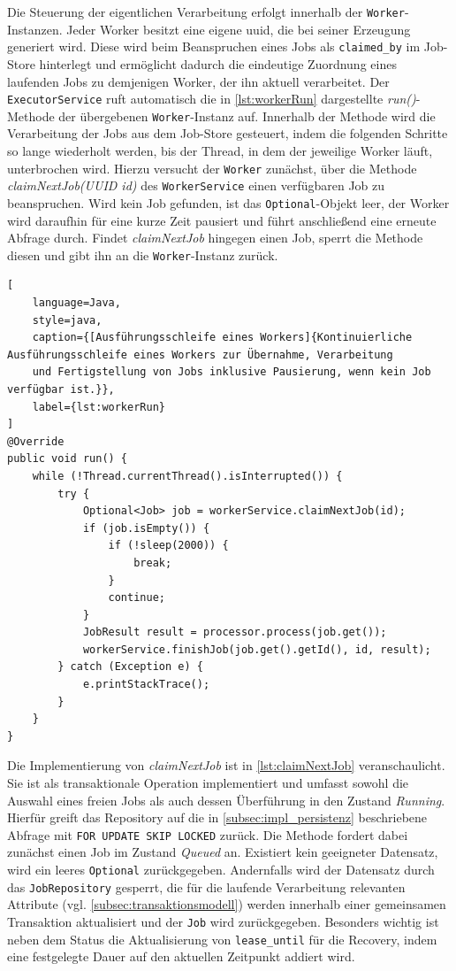 Die Steuerung der eigentlichen Verarbeitung erfolgt innerhalb der \texttt{Worker}-Instanzen.
Jeder Worker besitzt eine eigene \gls{uuid}, die bei seiner Erzeugung generiert wird.
Diese wird beim Beanspruchen eines Jobs als \texttt{claimed\_by} im Job-Store hinterlegt und ermöglicht dadurch die
eindeutige Zuordnung eines laufenden Jobs zu demjenigen Worker, der ihn aktuell verarbeitet.
Der \texttt{ExecutorService} ruft automatisch die in \cref{lst:workerRun} dargestellte \textit{run()}-Methode der übergebenen
\texttt{Worker}-Instanz auf.
Innerhalb der Methode wird die Verarbeitung der Jobs aus dem Job-Store gesteuert, indem die folgenden Schritte so lange wiederholt werden,
bis der Thread, in dem der jeweilige Worker läuft, unterbrochen wird.
Hierzu versucht der \texttt{Worker} zunächst, über die Methode \textit{claimNextJob(UUID id)} des \texttt{WorkerService}
einen verfügbaren Job zu beanspruchen.
Wird kein Job gefunden, ist das \texttt{Optional}-Objekt leer, der Worker wird daraufhin für eine kurze Zeit pausiert und
führt anschließend eine erneute Abfrage durch.
Findet \textit{claimNextJob} hingegen einen Job, sperrt die Methode diesen und gibt ihn an die \texttt{Worker}-Instanz zurück.

\begin{lstlisting}[
    language=Java,
    style=java,
    caption={[Ausführungsschleife eines Workers]{Kontinuierliche Ausführungsschleife eines Workers zur Übernahme, Verarbeitung
    und Fertigstellung von Jobs inklusive Pausierung, wenn kein Job verfügbar ist.}},
    label={lst:workerRun}
]
@Override
public void run() {
    while (!Thread.currentThread().isInterrupted()) {
        try {
            Optional<Job> job = workerService.claimNextJob(id);
            if (job.isEmpty()) {
                if (!sleep(2000)) {
                    break;
                }
                continue;
            }
            JobResult result = processor.process(job.get());
            workerService.finishJob(job.get().getId(), id, result);
        } catch (Exception e) {
            e.printStackTrace();
        }
    }
}
\end{lstlisting}

Die Implementierung von \textit{claimNextJob} ist in \cref{lst:claimNextJob} veranschaulicht.
Sie ist als transaktionale Operation implementiert und umfasst sowohl die Auswahl eines freien Jobs als auch
dessen Überführung in den Zustand \textit{Running}.
Hierfür greift das Repository auf die in \cref{subsec:impl_persistenz} beschriebene Abfrage mit \texttt{FOR UPDATE SKIP LOCKED} zurück.
Die Methode fordert dabei zunächst einen Job im Zustand \textit{Queued} an.
Existiert kein geeigneter Datensatz, wird ein leeres \texttt{Optional} zurückgegeben.
Andernfalls wird der Datensatz durch das \texttt{JobRepository} gesperrt, die für die laufende Verarbeitung relevanten
Attribute (vgl. \cref{subsec:transaktionsmodell}) werden innerhalb einer gemeinsamen Transaktion aktualisiert und der \texttt{Job} wird zurückgegeben.
Besonders wichtig ist neben dem Status die Aktualisierung von \texttt{lease\_until} für die Recovery, indem eine festgelegte Dauer auf
den aktuellen Zeitpunkt addiert wird.

